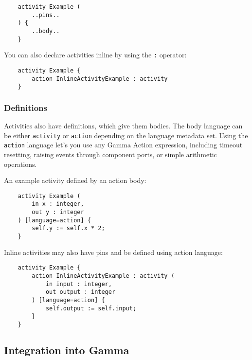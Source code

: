 \begin{lstlisting}
	activity Example (
		..pins..
	) {
		..body..
	}
\end{lstlisting}

You can also declare activities inline by using the \verb|:| operator:

\begin{lstlisting}
	activity Example {
		action InlineActivityExample : activity
	}
\end{lstlisting}

\subsubsection*{Definitions}

Activities also have definitions, which give them bodies. The body language can be either \verb|activity| or \verb|action| depending on the language metadata set. Using the \verb|action| language let's you use any Gamma Action expression, including timeout resetting, raising events through component ports, or simple arithmetic operations.

An example activity defined by an action body:

\begin{lstlisting}
	activity Example (
		in x : integer,
		out y : integer
	) [language=action] {
		self.y := self.x * 2;
	}
\end{lstlisting}

Inline activities may also have pins and be defined using action language:

\begin{lstlisting}
	activity Example {
		action InlineActivityExample : activity (
			in input : integer,
			out output : integer
		) [language=action] {
			self.output := self.input;
		}
	}
\end{lstlisting}

\subsection{Integration into Gamma}\label{ssec:integration-into-gamma}
